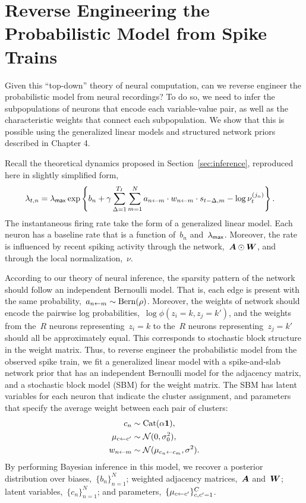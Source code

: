 \section{Reverse Engineering the Probabilistic Model from Spike Trains}

Given this ``top-down'' theory of neural computation, can we reverse
engineer the probabilistic model from neural recordings? To do so, we
need to infer the subpopulations of neurons that encode each
variable-value pair, as well as the characteristic weights that
connect each subpopulation.  We show that this is possible using the
generalized linear models and structured network priors described in
Chapter 4.


Recall the theoretical dynamics proposed in Section~\ref{sec:inference},
 reproduced here in slightly simplified form,
\begin{align*}
  \lambda_{t,n} &= \lambda_{\mathsf{max}}
  \exp \left \{b_n + \gamma \sum_{\Delta=1}^{T_I} \sum_{m=1}^N a_{n \leftarrow m} \cdot w_{n \leftarrow m} \cdot s_{t-\Delta,m}
  - \log \nu_t^{(j_n)} \right \}.
\end{align*}
The instantaneous firing rate take the form of a generalized linear model.
Each neuron has a baseline rate that is a function of~$b_n$ and~$\lambda_{\mathsf{max}}$.
Moreover, the rate is influenced by recent spiking activity through
the network,~$\boldsymbol{A} \odot \boldsymbol{W}$, and through the local normalization,~$\nu$. 

According to our theory of neural inference, the sparsity pattern of
the network should follow an independent Bernoulli model. That is,
each edge is present with the same probability,~${a_{n \leftarrow m} \sim
  \mathrm{Bern}(\rho)}$.  Moreover, the weights of network should
encode the pairwise log probabilities,~${\log \phi(z_i=k, z_j=k')}$,
and the weights from the~$R$ neurons representing~${z_i=k}$ to the~$R$
neurons representing~${z_j=k'}$ should all be approximately
equal. This corresponds to stochastic block structure in the weight
matrix. Thus, to reverse engineer the probabilistic model from the
observed spike train, we fit a generalized linear model with a
spike-and-slab network prior that has an independent Bernoulli model
for the adjacency matrix, and a stochastic block model (SBM) for the
weight matrix. The SBM has latent variables for each neuron that
indicate the cluster assignment, and parameters that specify the
average weight between each pair of clusters:
\begin{align*}
  c_n & \sim \mathrm{Cat}(\alpha \boldsymbol{1}), \\
  \mu_{c \leftarrow c'} &\sim \mathcal{N}(0, \sigma_0^2), \\
  w_{n \leftarrow m} &\sim \mathcal{N}(\mu_{c_n \leftarrow c_m}, \sigma^2).
\end{align*}
By performing Bayesian inference in this model, we recover a posterior
distribution over biases,~$\{b_n\}_{n=1}^N$; weighted adjacency
matrices,~$\boldsymbol{A}$ and~$\boldsymbol{W}$; latent variables,~$\{c_n\}_{n=1}^N$; and
parameters,~$\{\mu_{c \leftarrow c'}\}_{c,c'=1}^C$.

